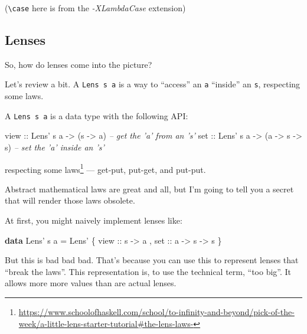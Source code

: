 \documentclass[]{article}
\newenvironment{Shaded}{}{}
\newcommand{\CommentTok}[1]{\textcolor[rgb]{0.38,0.63,0.69}{\textit{#1}}}
\newcommand{\DataTypeTok}[1]{\textcolor[rgb]{0.56,0.13,0.00}{#1}}
\newcommand{\FunctionTok}[1]{\textcolor[rgb]{0.02,0.16,0.49}{#1}}
\newcommand{\KeywordTok}[1]{\textcolor[rgb]{0.00,0.44,0.13}{\textbf{#1}}}
\newcommand{\NormalTok}[1]{#1}
\newcommand{\OtherTok}[1]{\textcolor[rgb]{0.00,0.44,0.13}{#1}}
\renewcommand{\href}[2]{#2\footnote{\url{#1}}}
\begin{document}
(\texttt{\textbackslash{}case} here is from the \emph{-XLambdaCase} extension)

\hypertarget{lenses}{%
\subsection{Lenses}\label{lenses}}

So, how do lenses come into the picture?

Let's review a bit. A \texttt{Lens\textquotesingle{}\ s\ a} is a way to
``access'' an \texttt{a} ``inside'' an \texttt{s}, respecting some laws.

A \texttt{Lens\textquotesingle{}\ s\ a} is a data type with the following API:

\begin{Shaded}
\begin{Highlighting}[]
\OtherTok{view ::} \DataTypeTok{Lens'}\NormalTok{ s a }\OtherTok{->}\NormalTok{ (s }\OtherTok{->}\NormalTok{ a)                }\CommentTok{-- get the 'a' from an 's'}
\OtherTok{set  ::} \DataTypeTok{Lens'}\NormalTok{ s a }\OtherTok{->}\NormalTok{ (a }\OtherTok{->}\NormalTok{ s }\OtherTok{->}\NormalTok{ s)           }\CommentTok{-- set the 'a' inside an 's'}
\end{Highlighting}
\end{Shaded}

respecting
\href{https://www.schoolofhaskell.com/school/to-infinity-and-beyond/pick-of-the-week/a-little-lens-starter-tutorial\#the-lens-laws-}{some
laws} --- get-put, put-get, and put-put.

Abstract mathematical laws are great and all, but I'm going to tell you a secret
that will render those laws obsolete.

At first, you might naively implement lenses like:

\begin{Shaded}
\begin{Highlighting}[]
\KeywordTok{data} \DataTypeTok{Lens'}\NormalTok{ s a }\FunctionTok{=} \DataTypeTok{Lens'}\NormalTok{ \{}\OtherTok{ view ::}\NormalTok{ s }\OtherTok{->}\NormalTok{ a}
\NormalTok{                       ,}\OtherTok{ set  ::}\NormalTok{ a }\OtherTok{->}\NormalTok{ s }\OtherTok{->}\NormalTok{ s}
\NormalTok{                       \}}
\end{Highlighting}
\end{Shaded}

But this is bad bad bad. That's because you can use this to represent lenses
that ``break the laws''. This representation is, to use the technical term,
``too big''. It allows more more values than are actual lenses.
\end{document}
